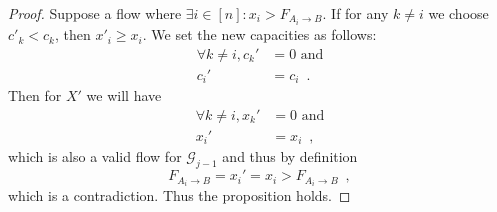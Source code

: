 \begin{proof}
   Suppose a flow where $\exists i \in [n] : x_i > F_{A_i \rightarrow B}$. If for any $k \neq i$ we choose $c'_k < c_k$, then
   $x'_i \geq x_i$. We set the new capacities as follows:
   \begin{align*}
      \forall k \neq i, c_k' &= 0 \mbox{ and} \\
      c_i' &= c_i \enspace.
   \end{align*}
   Then for $X'$ we will have
   \begin{align*}
      \forall k \neq i, x_k' &= 0 \mbox{ and} \\
      x_i' &= x_i \enspace,
   \end{align*}
   which is also a valid flow for $\mathcal{G}_{j-1}$ and thus by definition
   \begin{equation*}
      F_{A_i \rightarrow B} = x_i' = x_i > F_{A_i \rightarrow B} \enspace,
   \end{equation*}
   which is a contradiction. Thus the proposition holds.
\end{proof}
